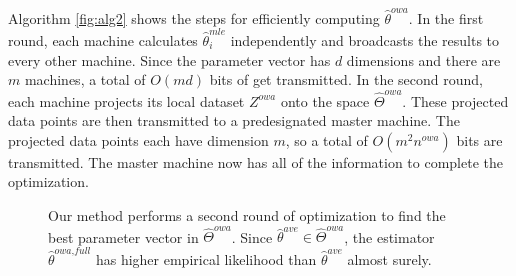 \documentclass[twoside]{article}
\newcommand{\Zreopt}{Z^{\textit{owa}}}
\newcommand{\nreopt}{n^{\textit{owa}}}
\newcommand{\W}{{\hat \Theta^{\textit{owa}}}}
\newcommand{\E}{\mathbb{E}}
\newcommand{\x}{\mathbf{x}}
\newcommand{\w}{\theta}
\newcommand{\wowa}{\hat\w^{owa}}
\newcommand{\wowafull}{\hat\w^{\textit{owa,full}}}
\newcommand{\wave}{\hat\w^{ave}}
\newcommand{\wmle}{\hat\w^{mle}}
\newcommand{\trans}[1]{\ensuremath{{#1}^{\mathsf{T}}}}
\begin{document}
Algorithm \ref{fig:alg2} shows the steps for efficiently computing $\wowa$.
In the first round, each machine calculates $\wmle_i$ independently and broadcasts the results to every other machine.
Since the parameter vector has $d$ dimensions and there are $m$ machines, a total of $O(md)$ bits of get transmitted.
In the second round, each machine projects its local dataset $\Zreopt$ onto the space $\W$.
These projected data points are then transmitted to a predesignated master machine.
The projected data points each have dimension $m$, so a total of $O(m^2\nreopt)$ bits are transmitted.
The master machine now has all of the information to complete the optimization.

\begin{figure}
\hspace{-0.1in}
\caption{
    Our method performs a second round of optimization to find the best parameter vector in $\W$.
    Since $\wave\in\W$, the estimator $\wowafull$ has higher empirical likelihood than $\wave$ almost surely.
}
\label{fig:contour}
\end{figure}
\end{document}
